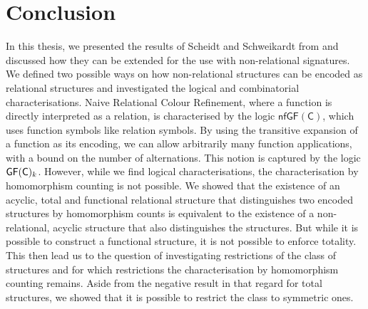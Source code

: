 \section{Conclusion}

In this thesis, we presented the results of Scheidt and Schweikardt from \cite{scheidt2025ColorRefinement} and discussed how they can be extended for the use with non-relational signatures.
We defined two possible ways on how non-relational structures can be encoded as relational structures and investigated the logical and combinatorial characterisations.
Naive Relational Colour Refinement, where a function is directly interpreted as a relation, is characterised by the logic $\mathsf{nfGF}(\mathsf C)$, which uses function symbols like relation symbols.
By using the transitive expansion of a function as its encoding, we can allow arbitrarily many function applications, with a bound on the number of alternations. 
This notion is captured by the logic $\mathsf{GF}(\mathsf{C})_k$.
However, while we find logical characterisations, the characterisation by homomorphism counting is not possible.
We showed that the existence of an acyclic, total and functional relational structure that distinguishes two encoded structures by homomorphism counts is equivalent to the existence of a non-relational, acyclic structure that also distinguishes the structures.
But while it is possible to construct a functional structure, it is not possible to enforce totality.
This then lead us to the question of investigating restrictions of the class of structures and for which restrictions the characterisation by homomorphism counting remains.
Aside from the negative result in that regard for total structures, we showed that it is possible to restrict the class to symmetric ones.

